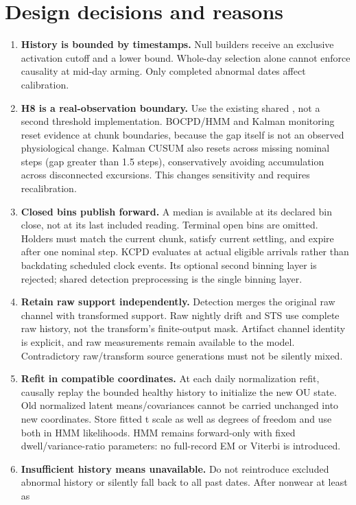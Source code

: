 \documentclass[11pt,a4paper]{article}
\newcommand{\code}[1]{\texttt{\detokenize{#1}}}
\begin{document}
\section{Design decisions and reasons}
\begin{enumerate}
\item \textbf{History is bounded by timestamps.} Null builders receive an exclusive
activation cutoff and a lower bound. Whole-day selection alone cannot enforce
causality at mid-day arming. Only completed abnormal dates affect calibration.
\item \textbf{H8 is a real-observation boundary.} Use the existing shared
\code{assign_chunks}, not a second threshold implementation. BOCPD/HMM and Kalman
monitoring reset evidence at chunk boundaries, because the gap itself is not an
observed physiological change. Kalman CUSUM also resets across missing nominal steps
(gap greater than 1.5 steps), conservatively avoiding accumulation across disconnected
excursions. This changes sensitivity and requires recalibration.
\item \textbf{Closed bins publish forward.} A median is available at its declared
bin close, not at its last included reading. Terminal open bins are omitted. Holders
must match the current chunk, satisfy current settling, and expire after one nominal
step. KCPD evaluates at actual eligible arrivals rather than backdating scheduled
clock events. Its optional second binning layer is rejected; shared detection
preprocessing is the single binning layer.
\item \textbf{Retain raw support independently.} Detection merges the original raw
channel with transformed support. Raw nightly drift and STS use complete raw history,
not the transform's finite-output mask. Artifact channel identity is explicit, and
raw measurements remain available to the model. Contradictory raw/transform source
generations must not be silently mixed.
\item \textbf{Refit in compatible coordinates.} At each daily normalization refit,
causally replay the bounded healthy history to initialize the new OU state. Old
normalized latent means/covariances cannot be carried unchanged into new coordinates.
Store fitted t scale as well as degrees of freedom and use both in HMM likelihoods.
HMM remains forward-only with fixed dwell/variance-ratio parameters: no full-record
EM or Viterbi is introduced.
\item \textbf{Insufficient history means unavailable.} Do not reintroduce excluded
abnormal history or silently fall back to all past dates. After nonwear at least as

\end{enumerate}
\end{document}
